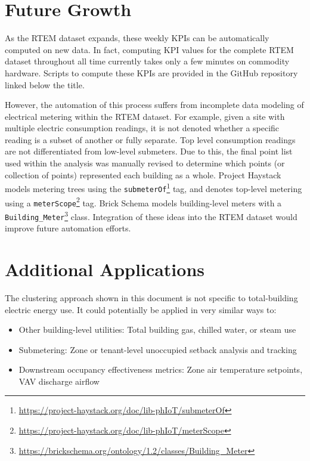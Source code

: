 \documentclass[a4paper]{article}
\begin{document}
\section{Future Growth}


As the RTEM dataset expands, these weekly KPIs can be automatically computed on new data. In fact, computing KPI values for the complete RTEM dataset throughout all time currently takes only a few minutes on commodity hardware. Scripts to compute these KPIs are provided in the GitHub repository linked below the title.

However, the automation of this process suffers from incomplete data modeling of electrical metering within the RTEM dataset. For example, given a site with multiple electric consumption readings, it is not denoted whether a specific reading is a subset of another or fully separate. Top level consumption readings are not differentiated from low-level submeters. Due to this, the final point list used within the analysis was manually revised to determine which points (or collection of points) represented each building as a whole. Project Haystack models metering trees using the \texttt{submeterOf}\footnote{\url{https://project-haystack.org/doc/lib-phIoT/submeterOf}} tag, and denotes top-level metering using a \texttt{meterScope}\footnote{\url{https://project-haystack.org/doc/lib-phIoT/meterScope}} tag. Brick Schema models building-level meters with a \texttt{Building\_Meter}\footnote{\url{https://brickschema.org/ontology/1.2/classes/Building\_Meter}} class. Integration of these ideas into the RTEM dataset would improve future automation efforts.

\section{Additional Applications}


The clustering approach shown in this document is not specific to total-building electric energy use. It could potentially be applied in very similar ways to:
\begin{itemize}
\item{Other building-level utilities: Total building gas, chilled water, or steam use}
\item{Submetering: Zone or tenant-level unoccupied setback analysis and tracking}
\item{Downstream occupancy effectiveness metrics: Zone air temperature setpoints, VAV discharge airflow}
\end{itemize}
\end{document}
